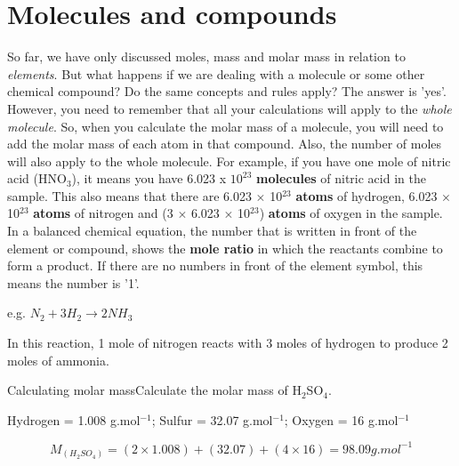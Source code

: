 



\section{Molecules and compounds}
\label{sec:quant:molecules}

So far, we have only discussed moles, mass and molar mass in relation to \textit{elements}. But what happens if we are dealing with a molecule or some other chemical compound? Do the same concepts and rules apply? The answer is 'yes'. However, you need to remember that all your calculations will apply to the \textit{whole molecule}. So, when you calculate the molar mass of a molecule, you will need to add the molar mass of each atom in that compound. Also, the number of moles will also apply to the whole molecule. For example, if you have one mole of nitric acid (HNO$_{3}$), it means you have 6.023 x $10^{23}$ \textbf{molecules} of nitric acid in the sample. This also means that there are 6.023 $\times$ 10$^{23}$ \textbf{atoms} of hydrogen, 6.023 $\times$ 10$^{23}$ \textbf{atoms} of nitrogen and (3 $\times$ 6.023 $\times$ 10$^{23}$) \textbf{atoms} of oxygen in the sample. \\

In a balanced chemical equation, the number that is written in front of the element or compound, shows the \textbf{mole ratio} in which the reactants combine to form a product. If there are no numbers in front of the element symbol, this means the number is '1'.

\begin{center}
e.g. \rm${N_{2} + 3H_{2} \rightarrow 2NH_{3}}$
\end{center}

In this reaction, 1 mole of nitrogen reacts with 3 moles of hydrogen to produce 2 moles of ammonia.

\begin{wex}{Calculating molar mass}{Calculate the molar mass of H$_{2}$SO$_{4}$.\\}

{

Hydrogen = 1.008 g.mol$^{-1}$; Sulfur = 32.07 g.mol$^{-1}$; Oxygen = 16 g.mol$^{-1}$\\}

{

\begin{equation*}
M_{(H_{2}SO_{4})} = (2 \times 1.008) + (32.07) + (4 \times 16) = 98.09 g.mol^{-1}
\end{equation*}
}

\end{wex}

